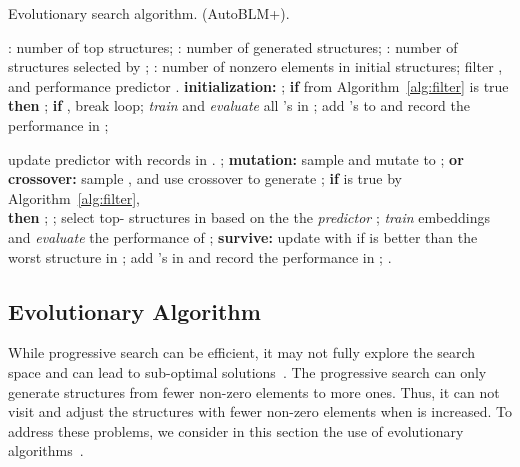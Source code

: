 \documentclass[10pt,journal,compsoc]{IEEEtran}
\begin{document}
\begin{algorithm}[t]
	\caption{Evolutionary search algorithm. (AutoBLM+).}
	\label{alg:evolution}
	\small
	\begin{algorithmic}[1]
		\REQUIRE 
		: number of top structures;
		: number of generated structures;
		: number of structures selected by ;
		: number of nonzero elements in initial structures;
		filter , and performance predictor .
		\STATE \textbf{initialization:} ; \label{step:evol:init}
		\STATE \textbf{if}  from Algorithm~\ref{alg:filter} is true  \textbf{then} ;
		\STATE \textbf{if} , break loop;
		\ENDFOR 
		\STATE \textit{train} and \textit{evaluate} all 's in ; \label{step:evol:endinit}
		\STATE add 's to  and record the performance in ;
		\REPEAT	\label{step:evo-init}
		
		\STATE update predictor  with records in .
		\REPEAT
\STATE ;
		\STATE \textbf{mutation:} sample  and mutate to ; \textbf{or}
		\STATE \textbf{crossover:} sample , and use crossover to generate ;
		\label{step:evo-co}
\label{step:evo-mu}
\STATE \textbf{if}  is true by Algorithm~\ref{alg:filter}, 
		\\ \textbf{then} ;
		\label{step:evo-filter}
		\UNTIL{}; \label{step:evo-end}
		\STATE  
		select top- structures  in  based on the 
		the \textit{predictor} ;
\label{step:evo-pred}
		\STATE  \textit{train} embeddings and \textit{evaluate} the performance of ;
		\label{step:evo-train}
		\STATE \textbf{survive:} update  with  if  is better than the worst structure in ;
		\label{step:evo-update}
		\ENDFOR
		\STATE add 's in  and record the performance in ;
		\RETURN .
	\end{algorithmic}
\end{algorithm}


\subsection{Evolutionary Algorithm}
\label{ssec:evolution}

While progressive search 
can be efficient,
it may not fully explore the search space and can lead to 
sub-optimal solutions~\cite{tropp2004greed}.
The progressive search can only generate structures from fewer non-zero elements
to more ones.
Thus, it can not visit and adjust the structures with fewer non-zero elements
when  is increased.
To address these problems, we consider in this section the use of evolutionary
algorithms~\cite{back1996evolutionary}.
\end{document}
